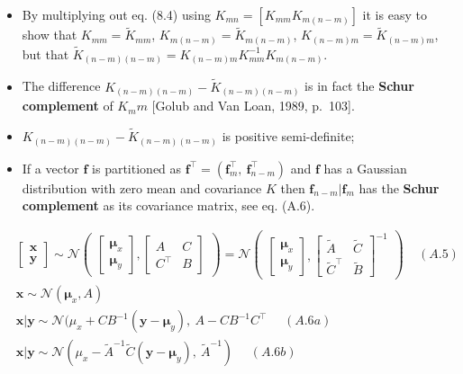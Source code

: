 \documentclass[
  ignorenonframetext,
]{beamer}
\begin{document}
\begin{frame}{}
\protect\hypertarget{section-2}{}
\begin{itemize}
\item
  By multiplying out eq. (8.4) using \(K_{mn} = [K_{mm}K_{m(n-m)}]\) it
  is easy to show that \(K_{mm} = { \tilde K}_{mm}\),
  \(K_{m(n-m)} = { \tilde K}_{m(n-m)}\),
  \(K_{(n-m)m} = { \tilde K}_{(n-m)m}\), but that
  \({\tilde K}_{(n-m)(n-m)} = K_{(n-m)m}K_{mm}^{-1} K_{m(n-m)}\).
\item
  The difference \(K_{(n-m)(n-m)} - {\tilde K}_{(n-m)(n-m)}\) is in fact
  the \textbf{Schur complement} of \(K_mm\) {[}Golub and Van Loan, 1989,
  p.~103{]}.
\item
  \(K_{(n-m)(n-m)} - {\tilde K}_{(n-m)(n-m)}\) is positive
  semi-definite;
\item
  If a vector \(\pmb f\) is partitioned as
  \(\pmb f^{\top} = (\pmb f_m^{\top},\ \pmb f_{n-m}^{\top})\) and
  \(\pmb f\) has a Gaussian distribution with zero mean and covariance
  \(K\) then \(\pmb f_{n-m} | \pmb f_m\) has the \textbf{Schur
  complement} as its covariance matrix, see eq. (A.6).
\end{itemize}
\end{frame}

\begin{frame}{}
\protect\hypertarget{section-3}{}
\[
\begin{split}
& \begin{bmatrix}
\pmb x\\
\pmb y
\end{bmatrix}
\sim
\mathcal N 
\begin{pmatrix}
\begin{bmatrix}
\pmb \mu_x\\
\pmb \mu_y
\end{bmatrix},
\begin{bmatrix}
A & C\\
C^{\top} & B
\end{bmatrix}
\end{pmatrix} = 
\mathcal N 
\begin{pmatrix}
\begin{bmatrix}
\pmb \mu_x\\
\pmb \mu_y
\end{bmatrix},
\begin{bmatrix}
\tilde A & \tilde C\\
\tilde C^{\top} & \tilde B
\end{bmatrix}^{-1}
\end{pmatrix} \ \ \ \ \ (A.5)\\
& \pmb x \sim \mathcal N (\pmb \mu_x, A)\\
& \pmb x|\pmb y \sim \mathcal N (\mu_x + CB^{−1}(\pmb y − \pmb \mu_y),\  A − CB^{−1}C^{\top}\ \ \ \ \ \ (A.6a)\\
& \pmb x|\pmb y \sim \mathcal N (\mu_x − \tilde A^{−1} \tilde C(\pmb y − \pmb \mu_y),\  \tilde A^{−1})\ \ \ \ \ \ (A.6b)
\end{split}
\]
\end{frame}
\end{document}
